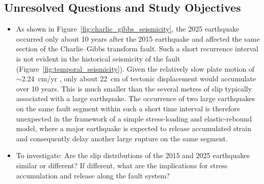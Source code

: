 \subsection{Unresolved Questions and Study Objectives}
\begin{itemize}
    \item As shown in Figure~\ref{fig:charlie_gibbs_seismicity}, the 2025 earthquake occurred only about 10 years after the 2015 
    earthquake and affected the same section of the Charlie--Gibbs transform fault. Such a short recurrence interval is not evident 
    in the historical seismicity of the fault (Figure~\ref{fig:temporal_seismicity}). Given the relatively slow plate motion
     of $\sim$2.24~cm/yr \cite{DeMets1990}, only about 22~cm of tectonic displacement would accumulate over 10 years. This is much 
     smaller than the several metres of slip typically associated with a large earthquake. The occurrence of two large earthquakes 
     on the same fault segment within such a short time interval is therefore unexpected in the framework of a simple stress-loading 
     and elastic-rebound model, where a major earthquake is expected to release accumulated strain and consequently delay another 
     large rupture on the same segment.
    \item To investigate: Are the slip distributions of the 2015 and 2025 earthquakes similar or different? If different, what are
     the implications for stress accumulation and release along the fault system?
\end{itemize}


